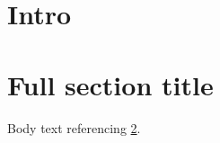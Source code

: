 \documentclass{article}
\begin{document}
\tableofcontents
\section{Intro}\label{sec:intro}
\section[Short title~\cite{k1} (\ref{sec:intro})]{Full section title~\cite{k2}}\label{sec:two}
Body text referencing \ref{sec:two}.


\end{document}
